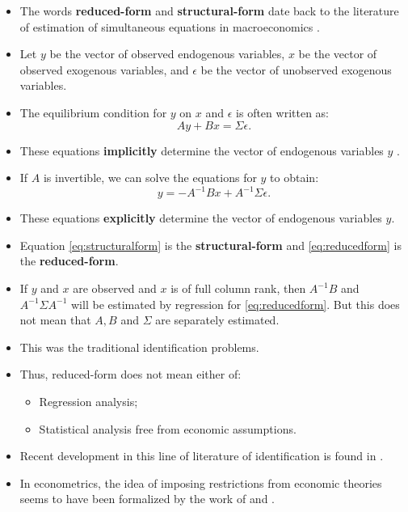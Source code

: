 \documentclass[
]{book}
\providecommand{\tightlist}{%
  \setlength{\itemsep}{0pt}\setlength{\parskip}{0pt}}
\begin{document}
\begin{itemize}
\tightlist
\item
  The words \textbf{reduced-form} and \textbf{structural-form} date back to the literature of estimation of simultaneous equations in macroeconomics \citep{Hsiao1983}.
\item
  Let \(y\) be the vector of observed endogenous variables, \(x\) be the vector of observed exogenous variables, and \(\epsilon\) be the vector of unobserved exogenous variables.
\item
  The equilibrium condition for \(y\) on \(x\) and \(\epsilon\) is often written as:
  \begin{equation}
  Ay + Bx = \Sigma \epsilon. \label{eq:structuralform}
  \end{equation}
\item
  These equations \textbf{implicitly} determine the vector of endogenous variables \(y\) .
\item
  If \(A\) is invertible, we can solve the equations for \(y\) to obtain:
  \begin{equation}
  y = - A^{-1} B x + A^{-1} \Sigma \epsilon. \label{eq:reducedform}
  \end{equation}
\item
  These equations \textbf{explicitly} determine the vector of endogenous variables \(y\).
\item
  Equation \eqref{eq:structuralform} is the \textbf{structural-form} and \eqref{eq:reducedform} is the \textbf{reduced-form}.
\item
  If \(y\) and \(x\) are observed and \(x\) is of full column rank, then \(A^{-1}B\) and \(A^{-1} \Sigma A^{-1}\) will be estimated by regression for \eqref{eq:reducedform}. But this does not mean that \(A, B\) and \(\Sigma\) are separately estimated.
\item
  This was the traditional identification problems.
\item
  Thus, reduced-form does not mean either of:

  \begin{itemize}
  \tightlist
  \item
    Regression analysis;
  \item
    Statistical analysis free from economic assumptions.
  \end{itemize}
\item
  Recent development in this line of literature of identification is found in \citet{Matzkin2007}.
\item
  In econometrics, the idea of imposing restrictions from economic theories seems to have been formalized by the work of \citet{Manski1994a} and \citet{Matzkin1994b}.
\end{itemize}
\end{document}
